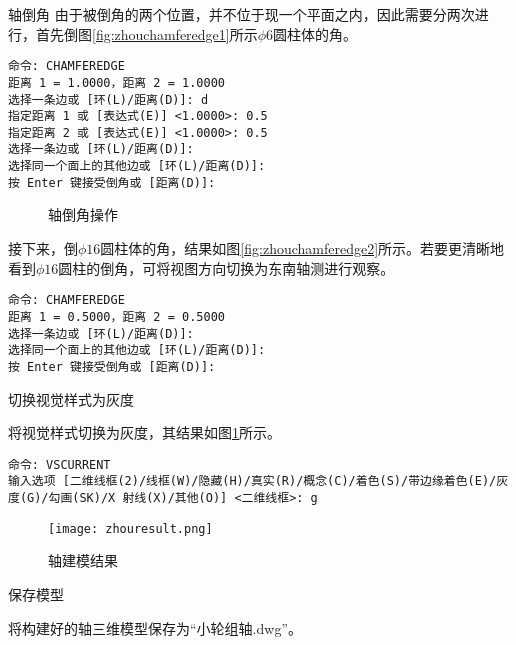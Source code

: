 \begin{procedure}
\item 轴倒角
由于被倒角的两个位置，并不位于现一个平面之内，因此需要分两次进行，首先倒图\ref{fig:zhouchamferedge1}所示$\phi 6$圆柱体的角。
\begin{lstlisting}
命令: CHAMFEREDGE
距离 1 = 1.0000，距离 2 = 1.0000
选择一条边或 [环(L)/距离(D)]: d
指定距离 1 或 [表达式(E)] <1.0000>: 0.5
指定距离 2 或 [表达式(E)] <1.0000>: 0.5
选择一条边或 [环(L)/距离(D)]:
选择同一个面上的其他边或 [环(L)/距离(D)]:
按 Enter 键接受倒角或 [距离(D)]:
\end{lstlisting}

\begin{figure}[htbp]
\centering
{}\hspace{20pt}
\caption{轴倒角操作}
\end{figure}

接下来，倒$\phi 16$圆柱体的角，结果如图\ref{fig:zhouchamferedge2}所示。若要更清晰地看到$\phi 16$圆柱的倒角，可将视图方向切换为东南轴测进行观察。

\begin{lstlisting}
命令: CHAMFEREDGE
距离 1 = 0.5000，距离 2 = 0.5000
选择一条边或 [环(L)/距离(D)]:
选择同一个面上的其他边或 [环(L)/距离(D)]:
按 Enter 键接受倒角或 [距离(D)]:
\end{lstlisting}

\item 切换视觉样式为灰度

将视觉样式切换为灰度，其结果如图\ref{fig:zhouresult}所示。
\begin{lstlisting}
命令: VSCURRENT
输入选项 [二维线框(2)/线框(W)/隐藏(H)/真实(R)/概念(C)/着色(S)/带边缘着色(E)/灰度(G)/勾画(SK)/X 射线(X)/其他(O)] <二维线框>: g
\end{lstlisting}
\begin{figure}[htbp]
\centering
\texttt{[image: zhouresult.png]}
\caption{轴建模结果}\label{fig:zhouresult}
\end{figure}
\item 保存模型

将构建好的轴三维模型保存为“小轮组轴.dwg”。
\end{procedure}

\endinput